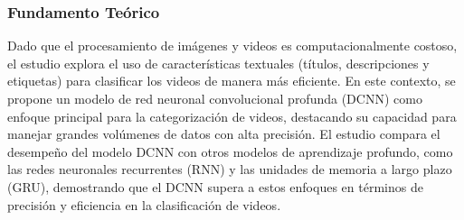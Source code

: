 \subsubsection {Fundamento Teórico}
Dado que el procesamiento de imágenes y videos es computacionalmente costoso, el estudio explora el uso de características textuales (títulos, descripciones y etiquetas) para clasificar los videos de manera más eficiente. En este contexto, se propone un modelo de red neuronal convolucional profunda (DCNN) como enfoque principal para la categorización de videos, destacando su capacidad para manejar grandes volúmenes de datos con alta precisión. El estudio compara el desempeño del modelo DCNN con otros modelos de aprendizaje profundo, como las redes neuronales recurrentes (RNN) y las unidades de memoria a largo plazo (GRU), demostrando que el DCNN supera a estos enfoques en términos de precisión y eficiencia en la clasificación de videos.

